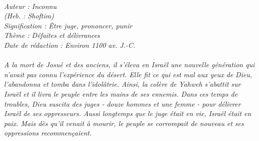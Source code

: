 \BFont
\noindent\hrulefill
{\footnotesize
\textit{
\bigskip
{\centering{}
\\Auteur : Inconnu
\\(Heb. : Shoftim)
\\Signification : Être juge, prononcer, punir
\\Thème : Défaites et délivrances
\\Date de rédaction : Environ 1100 av. J.-C.\\}
}
\textit{
\\A la mort de Josué et des anciens, il s'éleva en Israël une nouvelle génération qui n'avait pas connu l'expérience du désert. Elle fit ce qui est mal aux yeux de Dieu, l'abandonna et tomba dans l'idolâtrie. Ainsi, la colère de Yahweh s'abattit sur Israël et il livra le peuple entre les mains de ses ennemis. Dans ces temps de troubles, Dieu suscita des juges - douze hommes et une femme - pour délivrer Israël de ses oppresseurs. Aussi longtemps que le juge était en vie, Israël était en paix. Mais dès qu'il venait à mourir, le peuple se corrompait de nouveau et ses oppressions recommençaient.\bigskip
}
}
\par\nobreak\noindent\hrulefill
